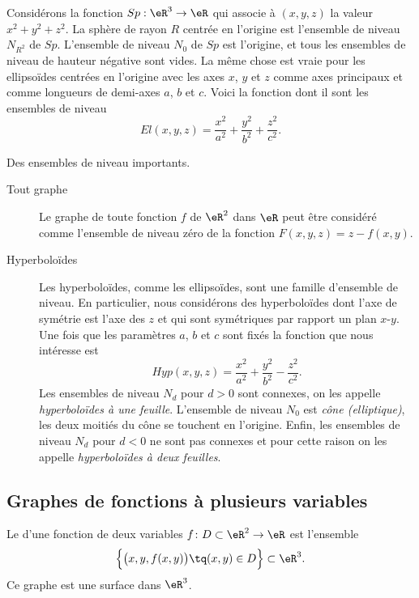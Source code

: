 Considérons la fonction $Sp: \eR^3\to \eR$ qui associe à $(x,y,z)$ la valeur $x^2+y^2+z^2$. La sphère de rayon $R$ centrée en l'origine est l'ensemble de niveau $N_{R^2}$ de $Sp$. L'ensemble de niveau $N_{0}$ de $Sp$ est l'origine, et tous les ensembles de niveau de hauteur négative sont vides. La même chose est vraie pour les ellipsoïdes centrées en l'origine avec les axes $x$, $y$ et $z$ comme axes principaux et comme longueurs de demi-axes $a$, $b$ et $c$. Voici la fonction dont il sont les ensembles de niveau
\[
El(x,y,z)= \frac{x^2}{a^2}+\frac{y^2}{b^2}+\frac{z^2}{c^2}.
\]
\begin{example}
	Des ensembles de niveau importants.
  \begin{description}
    \item[Tout graphe]
	    Le graphe de toute fonction $f$  de $\eR^2$ dans $\eR$ peut être considéré comme l'ensemble de niveau zéro de la fonction $F(x,y,z)=z-f(x,y)$.

    \item[Hyperboloïdes]
	    Les hyperboloïdes, comme les ellipsoïdes, sont une famille d'ensemble de niveau. En particulier, nous considérons des hyperboloïdes dont l'axe de symétrie est l'axe des $z$ et qui sont symétriques par rapport un plan $x$-$y$.  Une fois que les paramètres  $a$, $b$ et $c$ sont fixés la fonction que nous intéresse est
\[
Hyp(x,y,z)= \frac{x^2}{a^2}+\frac{y^2}{b^2}-\frac{z^2}{c^2}.
\]
Les ensembles de niveau $N_d$ pour $d>0$ sont connexes, on les appelle \emph{hyperboloïdes à une feuille}. L'ensemble de niveau $N_0$ est \emph{cône (elliptique)}, les deux moitiés du cône se touchent en l'origine. Enfin, les ensembles de niveau $N_d$ pour $d<0$ ne sont  pas connexes et pour cette raison on les appelle \emph{hyperboloïdes à deux feuilles}.
  \end{description}
\end{example}

\subsection{Graphes de fonctions à plusieurs variables}

Le  d'une fonction de deux variables $f\colon D\subset\eR^2\to \eR$ est l'ensemble
\begin{equation}
    \Big\{   \big( x,y,f(x,y) \big) \tq (x,y)\in D \Big\}\subset\eR^3.
\end{equation}
Ce graphe est une surface dans $\eR^3$.

